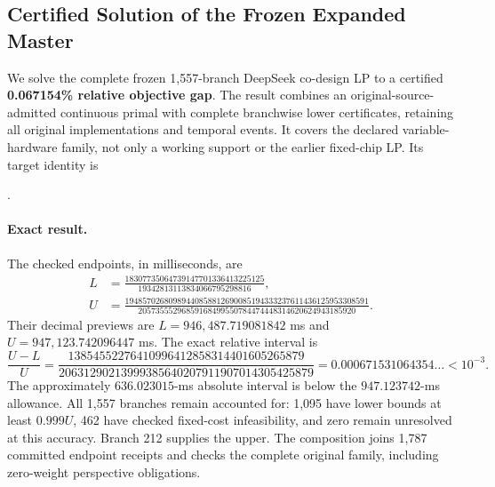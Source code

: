 \subsection{Certified Solution of the Frozen Expanded Master}
\label{app:expanded_native_certificate}
We solve the complete frozen 1,557-branch DeepSeek co-design LP to a certified
\textbf{0.067154\% relative objective gap}. The result combines an
original-source-admitted continuous primal with complete branchwise lower
certificates, retaining all original implementations and temporal events.
It covers the declared variable-hardware family, not only a working support
or the earlier fixed-chip LP. Its target identity is
\begin{center}\small
{}.
\end{center}

\paragraph{Exact result.}
The checked endpoints, in milliseconds, are
\begin{align*}
 L&=\frac{18307735064739147701336413225125}
          {19342813113834066795298816},\\
 U&=\frac{19485702680989440858812690085194333237611436125953308591}
          {20573555296859168499550784474448314620624943185920}.
\end{align*}
Their decimal previews are $L=946{,}487.719081842$ ms and
$U=947{,}123.742096447$ ms. The exact relative interval is
\[
 \frac{U-L}{U}
 =\frac{13854552276410996412858314401605265879}
       {20631290213999385640207911907014305425879}
 =0.000671531064354\ldots<10^{-3}.
\]
The approximately $636.023015$-ms absolute interval is below the
$947.123742$-ms allowance. All 1,557 branches remain accounted for:
1,095 have lower bounds at least $0.999U$, 462 have checked fixed-cost
infeasibility, and zero remain unresolved at this accuracy. Branch 212 supplies
the upper. The composition joins 1,787 committed endpoint receipts and checks
the complete original family, including zero-weight perspective obligations.

